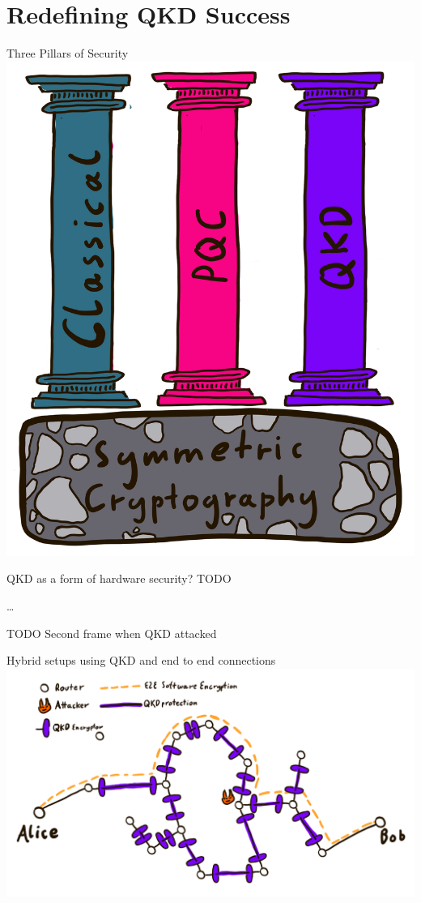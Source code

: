 \section{Redefining QKD Success}

\begin{frame}{Three Pillars of Security}
  \centering
  \includegraphics[height=\defaultframetextheight]{graphics/Three pillars of hybrid qkd.png}
\end{frame}

\begin{frame}{QKD as a form of hardware security?}
  TODO

  …

  TODO Second frame when QKD attacked
\end{frame}

\begin{frame}{Hybrid setups using QKD and end to end connections}
  \centering
  \includegraphics[height=\defaultframetextheight]{graphics/qkd-pqc-network.png}
\end{frame}
